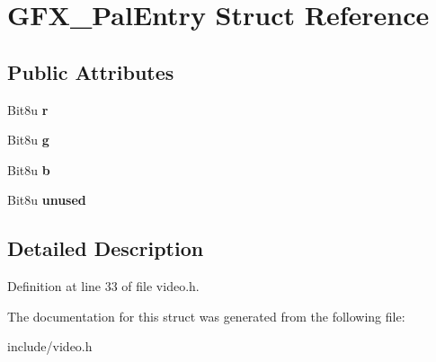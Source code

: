 \hypertarget{structGFX__PalEntry}{\section{G\-F\-X\-\_\-\-Pal\-Entry Struct Reference}
\label{structGFX__PalEntry}
}
\subsection*{Public Attributes}
\begin{DoxyCompactItemize}
\item 
\hypertarget{structGFX__PalEntry_a168e60d92d83d6f5574121a8abdc1d24}{Bit8u {\bfseries r}}\label{structGFX__PalEntry_a168e60d92d83d6f5574121a8abdc1d24}

\item 
\hypertarget{structGFX__PalEntry_aa54c26152cce6d8c780dddd5867824fd}{Bit8u {\bfseries g}}\label{structGFX__PalEntry_aa54c26152cce6d8c780dddd5867824fd}

\item 
\hypertarget{structGFX__PalEntry_af2fdb589046a5af2c5cd20e7e3b4b14e}{Bit8u {\bfseries b}}\label{structGFX__PalEntry_af2fdb589046a5af2c5cd20e7e3b4b14e}

\item 
\hypertarget{structGFX__PalEntry_a216b8a91ed27ccfdd77604b7f5099edf}{Bit8u {\bfseries unused}}\label{structGFX__PalEntry_a216b8a91ed27ccfdd77604b7f5099edf}

\end{DoxyCompactItemize}


\subsection{Detailed Description}


Definition at line 33 of file video.\-h.



The documentation for this struct was generated from the following file\-:\begin{DoxyCompactItemize}
\item 
include/video.\-h\end{DoxyCompactItemize}
